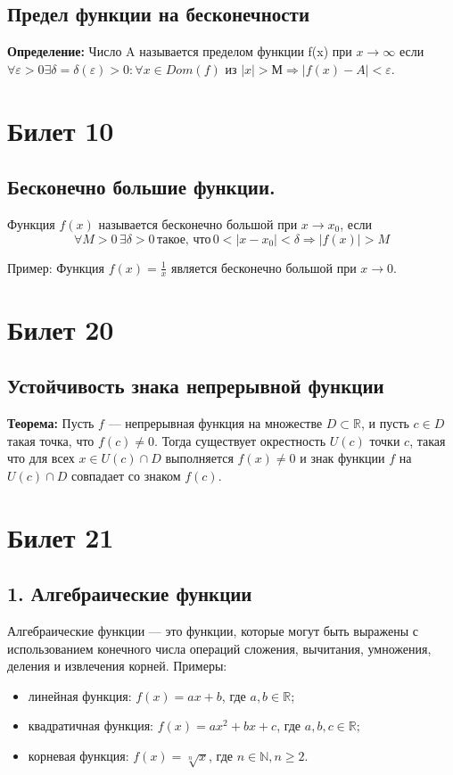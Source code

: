 \documentclass{article}
\begin{document}
\subsection*{Предел функции на бесконечности}
\textbf{Определение:} Число A называется пределом функции f(x) при $x \to \infty$ если
\(
\forall \varepsilon > 0 \exists \delta = \delta(\varepsilon) > 0 : \forall x \in Dom(f)
\) из \( |x| > М \Rightarrow |f(x) - A| < \varepsilon \).

\section{Билет 10}

\subsection*{Бесконечно большие функции.}

Функция \( f(x) \) называется бесконечно большой при \( x \to x_0 \), если
\[
\forall M > 0 \, \exists \delta > 0 \, \text{такое, что} \, 0 < |x - x_0| < \delta \Rightarrow |f(x)| > M
\]

Пример:
Функция \( f(x) = \frac{1}{x} \) является бесконечно большой при \( x \to 0 \).

\section{Билет 20}

\subsection*{Устойчивость знака непрерывной функции}

\textbf{Теорема:} Пусть $f$ — непрерывная функция на множестве $D \subset \mathbb{R}$, и пусть $c \in D$ такая точка, что $f(c) \neq 0$. Тогда существует окрестность $U(c)$ точки $c$, такая что для всех $x \in U(c) \cap D$ выполняется $f(x) \neq 0$ и знак функции $f$ на $U(c) \cap D$ совпадает со знаком $f(c)$.


\section{Билет 21}

\subsection*{1. Алгебраические функции}
Алгебраические функции — это функции, которые могут быть выражены с использованием конечного числа операций сложения, вычитания, умножения, деления и извлечения корней. Примеры:
\begin{itemize}
    \item линейная функция: $f(x) = ax + b$, где $a, b \in \mathbb{R}$;
    \item квадратичная функция: $f(x) = ax^2 + bx + c$, где $a, b, c \in \mathbb{R}$;
    \item корневая функция: $f(x) = \sqrt[n]{x}$, где $n \in \mathbb{N}, n \geq 2$.
\end{itemize}
\end{document}
